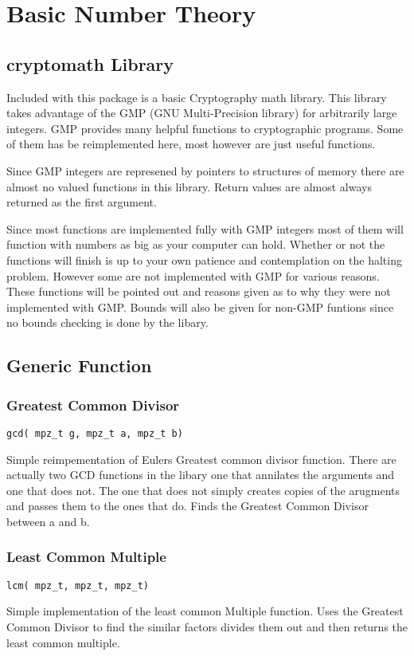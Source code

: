 

\chapter{Basic Number Theory}

\section{cryptomath Library}

Included with this package is a basic Cryptography math library. 
This library takes advantage of the GMP (GNU Multi-Precision library) for arbitrarily large integers.
GMP provides many helpful functions to cryptographic programs. 
Some of them has be reimplemented here, most however are just useful functions.

Since GMP integers are represened by pointers to structures of memory there are almost no valued functions in this library.
Return values are almost always returned as the first argument.

Since most functions are implemented fully with GMP integers most of them will function with numbers as big as your computer can hold.
Whether or not the functions will finish is up to your own patience and contemplation on the halting problem.
However some are not implemented with GMP for various reasons.
These functions will be pointed out and reasons given as to why they were not implemented with GMP.
Bounds will also be given for non-GMP funtions since no bounds checking is done by the libary.

\section{Generic Function}
\subsection{Greatest Common Divisor} 
\begin{verbatim}
gcd( mpz_t g, mpz_t a, mpz_t b)
\end{verbatim}

Simple reimpementation of Eulers Greatest common divisor function.
There are actually two GCD functions in the libary one that annilates the arguments and one that does not.
The one that does not simply creates copies of the arugments and passes them to the ones that do.
Finds the Greatest Common Divisor between a and b.

\subsection{Least Common Multiple }
\begin{verbatim}
lcm( mpz_t, mpz_t, mpz_t)
\end{verbatim}
Simple implementation of the least common Multiple function.
Uses the Greatest Common Divisor to find the similar factors divides them out and then returns the least common multiple.


